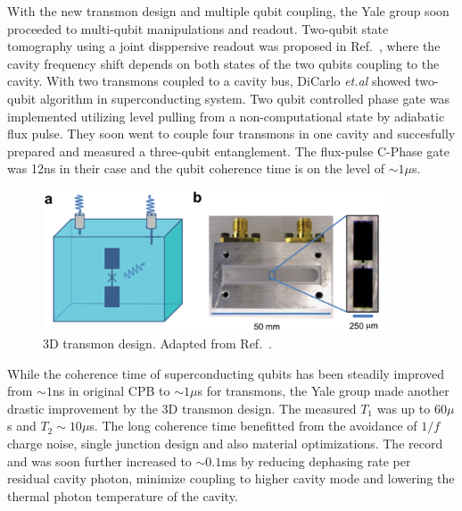 \documentclass[%
groupedaddress,
showpacs,
 amsmath,amssymb,
 aps,
prb,
]{revtex4-1}
\newcommand{\etal}{\textit{et.al}}
\begin{document}
With the new transmon design and multiple qubit coupling, the Yale group soon proceeded to multi-qubit manipulations and readout. Two-qubit state tomography using a joint disppersive readout was proposed in Ref.~, where the cavity frequency shift depends on both states of the two qubits coupling to the cavity. With two transmons coupled to a cavity bus, DiCarlo \etal{} showed two-qubit algorithm in superconducting system\cite{DiCarlo2009}. Two qubit controlled phase gate was implemented utilizing level pulling from a non-computational state by adiabatic flux pulse. They soon went to couple four transmons in one cavity and succesfully prepared and measured a three-qubit entanglement\cite{DiCarlo2010}. The flux-pulse C-Phase gate was 12ns in their case and the qubit coherence time is on the level of $\sim 1 \mu$s.


            \begin{figure}[h]
                \centering
                \includegraphics[width=4in]{review/3D_transmon2011.png}
                \caption{3D transmon design. Adapted from Ref.~.}
                \label{fig:Paik2011}
            \end{figure}

While the coherence time of superconducting qubits has been steadily improved from $\sim 1$ns in original CPB to $\sim 1 \mu$s for transmons, the Yale group made another drastic improvement by the 3D transmon design\cite{Paik2011}. The measured $T_1$ was up to $60\mu$s and $T_2 \sim 10\mu$s. The long coherence time benefitted from the avoidance of $1/f$ charge noise, single junction design and also material optimizations. The record and was soon further increased to $\sim 0.1$ms\cite{Rigetti2012} by reducing dephasing rate per residual cavity photon, minimize coupling to higher cavity mode and lowering the thermal photon temperature of the cavity.
\end{document}
